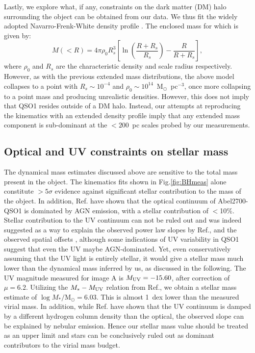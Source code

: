 \documentclass[twocolumn, fleqn]{doc_class}
\begin{document}
Lastly, we explore what, if any, constraints on the dark matter (DM) halo surrounding the object can be obtained from our data. We thus fit the widely adopted Navarro-Frenk-White density profile . The enclosed mass for which is given by:
\begin{equation}
    M(<R) = 4\pi\rho_0R_s^3\left[\ln(\frac{R+R_s}{R_s}) - \frac{R}{R+R_s}\right],
\end{equation}
where $\rho_0$ and $R_s$ are the characteristic density and scale radius respectively. However, as with the previous extended mass distributions, the above model collapses to a point with $R_s \sim 10^{-4}$ and $\rho_0 \sim 10^{14}$~M$_{\odot}$~pc$^{-3}$, once more collapsing to a point mass and producing unrealistic densities. However, this does not imply that QSO1 resides outside of a DM halo. Instead, our attempts at reproducing the kinematics with an extended density profile imply that any extended mass component is sub-dominant at the $<200$~pc scales probed by our measurements. 

\subsection*{Optical and UV constraints on stellar mass}
The dynamical mass estimates discussed above are sensitive to the total mass present in the object. The kinematics fits shown in Fig.\ref{fig:BHmeas} alone constitute $>5\sigma$ evidence against significant stellar contribution to the mass of the object. In addition, Ref. have shown that the optical continuum of Abel2700-QSO1 is dominated by AGN emission, with a stellar contribution of $<$10\%. Stellar contribution to the UV continuum can not be ruled out and was indeed suggested as a way to explain the observed power law slopes by Ref., and the observed spatial offsets , although some indications of UV variability in QSO1 suggest that even the UV maybe AGN-dominated. Yet, even conservatively assuming that the UV light is entirely stellar, it would give a stellar mass much lower than the dynamical mass inferred by us, as discussed in the following. The UV magnitude measured for image A is $M_{\rm UV} = -15.60$, after correction of $\mu=6.2$. Utilizing the $M_* - M_{\rm UV}$ relation from Ref., we obtain a stellar mass estimate of $\log{M_*/\mathrm{M}_{\odot}} = 6.03$. This is almost 1~dex lower than the measured virial mass. In addition, while Ref. have shown that the UV continuum is damped by a different hydrogen column density than the optical, the observed slope can be explained by nebular emission. Hence our stellar mass value should be treated as an upper limit and stars can be conclusively ruled out as dominant contributors to the virial mass budget. 
\end{document}
